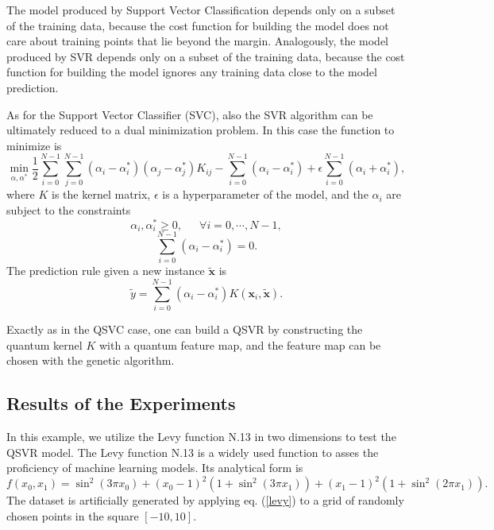 \documentclass[12pt]{article}
\begin{document}
The model produced by Support Vector Classification depends only on a subset of the training data, because the cost function for building the model does not care about training points that lie beyond the margin. Analogously, the model produced by SVR depends only on a subset of the training data, because the cost function for building the model ignores any training data close to the model prediction.

As for the Support Vector Classifier (SVC), also the SVR algorithm can be ultimately reduced to a dual minimization problem. In this case the function to minimize is \cite{druker}
\begin{equation}
    \min_{\alpha, \alpha^*} \frac{1}{2}\sum_{i=0}^{N-1}\sum_{j=0}^{N-1} (\alpha_i-\alpha^*_i)(\alpha_j-\alpha^*_j) K_{ij}-\sum_{i=0}^{N-1} (\alpha_i-\alpha^*_i)+\epsilon\sum_{i=0}^{N-1} (\alpha_i+\alpha^*_i),
\end{equation}
where $K$ is the kernel matrix, $\epsilon$ is a hyperparameter of the model, and the $\alpha_i$ are subject to the constraints 
\begin{equation}
    \alpha_i,\alpha^*_i\geq 0,\,\,\,\,\,\,\,\,\,\forall i=0,\cdots, N-1,
\end{equation}
\begin{equation}
    \sum_{i=0}^{N-1}(\alpha_i-\alpha^*_i)=0.
\end{equation}
The prediction rule given a new instance $\tilde{\mathbf{x}}$ is 
\begin{equation}
    \tilde{y}=\sum_{i=0}^{N-1} (\alpha_i-\alpha^*_i)K(\mathbf{x}_i, \tilde{\mathbf{x}}).
\end{equation}

Exactly as in the QSVC case, one can build a QSVR by constructing the quantum kernel $K$ with a quantum feature map, and the feature map can be chosen with the genetic algorithm. 

\subsection{Results of the Experiments}
In this example, we utilize the Levy function N.13 in two dimensions \cite{adorio} to test the QSVR model. The Levy function N.13 is a widely used function to asses the proficiency of machine learning models. Its analytical form is 
\begin{equation}
    f(x_0,x_1)=\sin^2(3\pi x_0)+(x_0-1)^2(1+\sin^2(3\pi x_1))+(x_1-1)^2(1+\sin^2(2\pi x_1)).
    \label{levy}
\end{equation} 
The dataset is artificially generated by applying eq. (\ref{levy}) to a grid of randomly chosen points in the square $[-10,10]$.
\end{document}
